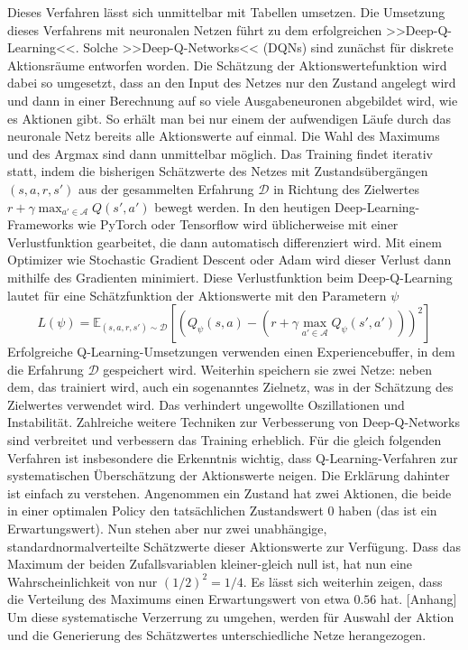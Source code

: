 Dieses Verfahren lässt sich unmittelbar mit Tabellen umsetzen.
Die Umsetzung dieses Verfahrens mit neuronalen Netzen führt zu dem erfolgreichen >>Deep-Q-Learning<<.
Solche >>Deep-Q-Networks<< (DQNs) sind zunächst für diskrete Aktionsräume entworfen worden.
Die Schätzung der Aktionswertefunktion wird dabei so umgesetzt, dass an den Input des Netzes nur den Zustand angelegt wird und dann in einer Berechnung auf so viele Ausgabeneuronen abgebildet wird, wie es Aktionen gibt.
So erhält man bei nur einem der aufwendigen Läufe durch das neuronale Netz bereits alle Aktionswerte auf einmal.
Die Wahl des Maximums und des Argmax sind dann unmittelbar möglich.
Das Training findet iterativ statt, indem die bisherigen Schätzwerte des Netzes mit Zustandsübergängen $(s, a, r, s')$ aus der gesammelten Erfahrung $\mathcal{D}$ in Richtung des Zielwertes $r+\gamma \max_{a'\in\mathcal{A}}{Q(s',a')}$ bewegt werden.
In den heutigen Deep-Learning-Frameworks wie PyTorch oder Tensorflow wird üblicherweise mit einer Verlustfunktion gearbeitet, die dann automatisch differenziert wird. \cite{NEURIPS2019_9015}
Mit einem Optimizer wie Stochastic Gradient Descent oder Adam \cite{adam2014} wird dieser Verlust dann mithilfe des Gradienten minimiert.
Diese Verlustfunktion beim Deep-Q-Learning lautet für eine Schätzfunktion der Aktionswerte mit den Parametern $\psi$
\begin{equation}
	L(\psi) = \mathbb{E}_{(s, a, r, s')\sim\mathcal{D}}\left[\left(Q_\psi(s,a)-\left(r+\gamma \max_{a'\in\mathcal{A}}{Q_\psi(s',a')}\right)\right)^2\right]
\end{equation}
Erfolgreiche Q-Learning-Umsetzungen verwenden einen Experiencebuffer, in dem die Erfahrung $\mathcal{D}$ gespeichert wird.
Weiterhin speichern sie zwei Netze: neben dem, das trainiert wird, auch ein sogenanntes Zielnetz, was in der Schätzung des Zielwertes verwendet wird.
Das verhindert ungewollte Oszillationen und Instabilität. \cite{atari2014}
Zahlreiche weitere Techniken zur Verbesserung von Deep-Q-Networks sind verbreitet und verbessern das Training erheblich. \cite{qlearningcomparison2017}
Für die gleich folgenden Verfahren ist insbesondere die Erkenntnis wichtig, dass Q-Learning-Verfahren zur systematischen Überschätzung der Aktionswerte neigen. \cite{qlearningoverestimation}
Die Erklärung dahinter ist einfach zu verstehen.
Angenommen ein Zustand hat zwei Aktionen, die beide in einer optimalen Policy den tatsächlichen Zustandswert 0 haben (das ist ein Erwartungswert).
Nun stehen aber nur zwei unabhängige, standardnormalverteilte Schätzwerte dieser Aktionswerte zur Verfügung.
Dass das Maximum der beiden Zufallsvariablen kleiner-gleich null ist, hat nun eine Wahrscheinlichkeit von nur $(1/2)^2=1/4$.
Es lässt sich weiterhin zeigen, dass die Verteilung des Maximums einen Erwartungswert von etwa $0.56$ hat. [Anhang]
Um diese systematische Verzerrung zu umgehen, werden für Auswahl der Aktion und die Generierung des Schätzwertes unterschiedliche Netze herangezogen.

